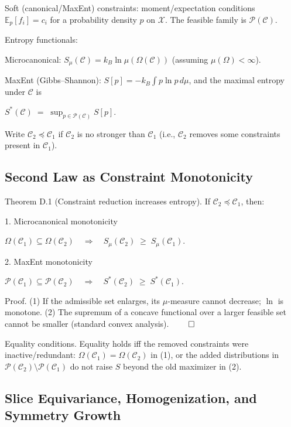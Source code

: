 \documentclass{article}
\begin{document}
Soft (canonical/MaxEnt) constraints: moment/expectation conditions $\mathbb{E}_p[f_i]=c_i$ for a probability density $p$ on $\mathcal{X}$.
The feasible family is $\mathcal{P}(\mathcal{C})$.

Entropy functionals:

Microcanonical: $S_\mu(\mathcal{C})=k_B \ln \mu(\Omega(\mathcal{C}))$ (assuming $\mu(\Omega)<\infty$).

MaxEnt (Gibbs–Shannon): $S[p]=-k_B \int p \ln p \,d\mu$, and the maximal entropy under $\mathcal{C}$ is

$S^*(\mathcal{C}) \;=\; \sup_{p\in \mathcal{P}(\mathcal{C})} S[p]$.

Write $\mathcal{C}_2 \preceq \mathcal{C}_1$ if $\mathcal{C}_2$ is no stronger than $\mathcal{C}_1$ (i.e., $\mathcal{C}_2$ removes some constraints present in $\mathcal{C}_1$).

\subsection{Second Law as Constraint Monotonicity}

Theorem D.1 (Constraint reduction increases entropy).
If $\mathcal{C}_2 \preceq \mathcal{C}_1$, then:

1. Microcanonical monotonicity

$\Omega(\mathcal{C}_1)\subseteq \Omega(\mathcal{C}_2) \quad\Rightarrow\quad
   S_\mu(\mathcal{C}_2)\; \ge\; S_\mu(\mathcal{C}_1)$.

2. MaxEnt monotonicity

$\mathcal{P}(\mathcal{C}_1)\subseteq \mathcal{P}(\mathcal{C}_2) \quad\Rightarrow\quad
   S^*(\mathcal{C}_2)\; \ge\; S^*(\mathcal{C}_1)$.

Proof.
(1) If the admissible set enlarges, its $\mu$-measure cannot decrease; $\ln$ is monotone.
(2) The supremum of a concave functional over a larger feasible set cannot be smaller (standard convex analysis). $\qed$

Equality conditions. Equality holds iff the removed constraints were inactive/redundant: $\Omega(\mathcal{C}_1)=\Omega(\mathcal{C}_2)$ in (1), or the added distributions in $\mathcal{P}(\mathcal{C}_2)\setminus\mathcal{P}(\mathcal{C}_1)$ do not raise $S$ beyond the old maximizer in (2).

\subsection{Slice Equivariance, Homogenization, and Symmetry Growth}
\end{document}
